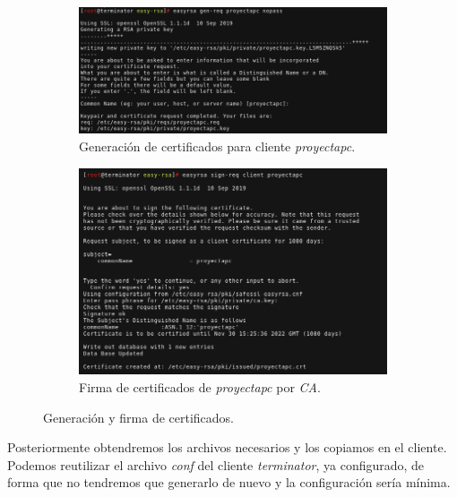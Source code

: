 \documentclass[a4paper, 11pt, titlepage]{article}
\begin{document}
        \begin{figure}[htp]
        \centering
            \begin{subfigure}[b]{1\linewidth}
            \includegraphics[width=1\textwidth]{resources/windows01.png}
            \caption{Generación de certificados para cliente \textit{proyectapc}.}
            \end{subfigure}

            \begin{subfigure}[b]{1\linewidth}
            \includegraphics[width=1\textwidth]{resources/windows02.png}
            \caption{Firma de certificados de \textit{proyectapc} por \textit{CA}.}
            \end{subfigure}
        \caption{Generación y firma de certificados.}
        \label{fig:windows0102}
        \end{figure}

        Posteriormente obtendremos los archivos necesarios y los copiamos en el cliente. Podemos
        reutilizar el archivo \textit{conf} del cliente \textit{terminator}, ya configurado, de forma
        que no tendremos que generarlo de nuevo y la configuración sería mínima.
\end{document}
